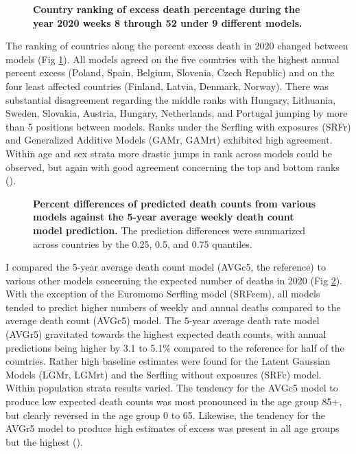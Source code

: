 \documentclass[10pt,letterpaper]{article}
\begin{document}

\begin{figure}[!ht]
  \caption{{\bf Country ranking of excess death percentage during the year 2020 weeks 8 through 52 under 9 different models.}}
  \label{Fig2}
\end{figure}

The ranking of countries along the percent excess death in 2020 changed between models (Fig \ref{Fig2}). All models agreed on the five countries with the highest annual percent excess (Poland, Spain, Belgium, Slovenia, Czech Republic) and on the four least affected countries (Finland, Latvia, Denmark, Norway). There was substantial disagreement regarding the middle ranks with Hungary, Lithuania, Sweden, Slovakia, Austria, Hungary, Netherlands, and Portugal jumping by more than 5 positions between models. Ranks under the Serfling with exposures (SRFr) and Generalized Additive Models (GAMr, GAMrt) exhibited high agreement. Within age and sex strata more drastic jumps in rank across models could be observed, but again with good agreement concerning the top and bottom ranks ().


\begin{figure}[!ht]
  \caption{{\bf Percent differences of predicted death counts from various models against the 5-year average weekly death count model prediction.} The prediction differences were summarized across countries by the 0.25, 0.5, and 0.75 quantiles.}
  \label{Fig3}
\end{figure}

I compared the 5-year average death count model (AVGc5, the reference) to various other models concerning the expected number of deaths in 2020 (Fig \ref{Fig3}). With the exception of the Euromomo Serfling model (SRFcem), all models tended to predict higher numbers of weekly and annual deaths compared to the average death count (AVGc5) model. The 5-year average death rate model (AVGr5) gravitated towards the highest expected death counts, with annual predictions being higher by 3.1 to 5.1\% compared to the reference for half of the countries. Rather high baseline estimates were found for the Latent Gaussian Models (LGMr, LGMrt) and the Serfling without exposures (SRFc) model. Within population strata results varied. The tendency for the AVGc5 model to produce low expected death counts was most pronounced in the age group 85+, but clearly reversed in the age group 0 to 65. Likewise, the tendency for the AVGr5 model to produce high estimates of excess was present in all age groups but the highest ().
\end{document}
